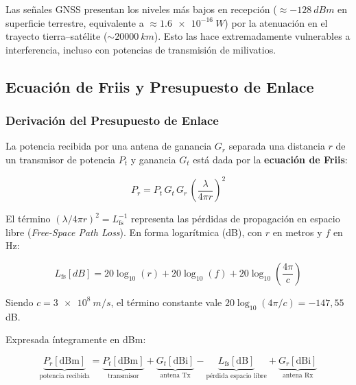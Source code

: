 \documentclass[12pt,a4paper]{article}
\begin{document}
\begin{notatec}
  Las señales GNSS presentan los niveles más bajos en recepción
  ($\approx\SI{-128}{dBm}$ en superficie terrestre, equivalente a
  $\approx\SI{1.6e-16}{W}$) por la atenuación en el trayecto
  tierra–satélite ($\sim\SI{20000}{km}$).
  Esto las hace extremadamente vulnerables a interferencia, incluso con
  potencias de transmisión de milivatios.
\end{notatec}

\subsection{Ecuación de Friis y Presupuesto de Enlace}

\subsubsection{Derivación del Presupuesto de Enlace}

La potencia recibida por una antena de ganancia $G_r$ separada una
distancia $r$ de un transmisor de potencia $P_t$ y ganancia $G_t$
está dada por la \textbf{ecuación de Friis}:

\begin{equation}
  P_r = P_t\,G_t\,G_r\,\left(\frac{\lambda}{4\pi r}\right)^2
  \label{eq:friis}
\end{equation}

El término $\left({\lambda}/{4\pi r}\right)^2 = L_\mathrm{fs}^{-1}$
representa las pérdidas de propagación en espacio libre
(\textit{Free-Space Path Loss}).
En forma logarítmica (\si{dB}), con $r$ en metros y $f$ en \si{Hz}:

\begin{equation}
  L_\mathrm{fs}[\si{dB}] = 20\log_{10}(r) + 20\log_{10}(f) + 20\log_{10}\!\left(\frac{4\pi}{c}\right)
  \label{eq:fspl_hz}
\end{equation}

Siendo $c = \SI{3e8}{m/s}$, el término constante vale
$20\log_{10}(4\pi/c) = -147{,}55$\,\si{dB}.

\medskip
Expresada íntegramente en \si{dBm}:

\begin{equation}
  \underbrace{P_r[\mathrm{dBm}]}_{\text{potencia recibida}}
  = \underbrace{P_t[\mathrm{dBm}]}_{\text{transmisor}}
  + \underbrace{G_t[\mathrm{dBi}]}_{\text{antena Tx}}
  - \underbrace{L_\mathrm{fs}[\mathrm{dB}]}_{\text{pérdida espacio libre}}
  + \underbrace{G_r[\mathrm{dBi}]}_{\text{antena Rx}}
  \label{eq:link_budget_db}
\end{equation}
\end{document}
